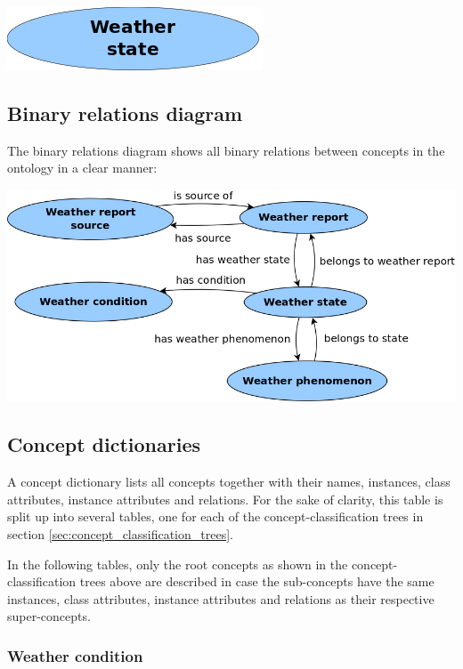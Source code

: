 \begin{center}
  \includegraphics[width=.3\textwidth]{figures/diagrams/weather-state.png}
\end{center}

\subsection{Binary relations diagram}
\label{sec:binary_relations_diagram}

The binary relations diagram shows all binary relations between concepts in the ontology in a clear manner:

\begin{center}
  \includegraphics[width=\textwidth]{figures/diagrams/binary-relations.png}
\end{center}

\subsection{Concept dictionaries}

A concept dictionary lists all concepts together with their names, instances, class attributes, instance attributes and relations. For the sake of clarity, this table is split up into several tables, one for each of the concept-classification trees in section \ref{sec:concept_classification_trees}.

In the following tables, only the root concepts as shown in the concept-classification trees above are described in case the sub-concepts have the same instances, class attributes, instance attributes and relations as their respective super-concepts.

\subsubsection{Weather condition}

